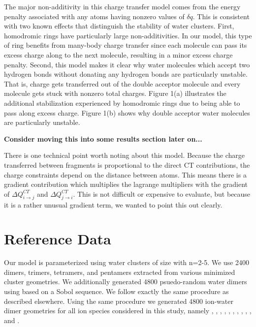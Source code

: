 \documentclass[journal=jacsat,manuscript=article]{achemso}
\begin{document}
The major non-additivity in this charge transfer model comes from
the energy penalty associated with any atoms having nonzero values of $\delta q$.
This is consistent with two known effects that distinguish the stability of water clusters.
First, homodromic rings have particularly large non-additivities.\cite{xantheas2000cooperativity}
In our model, this type of ring benefits from many-body charge transfer since each molecule
can pass its excess charge along to the next molecule, resulting in a minor excess charge penalty.
Second, this model makes it clear why water molecules which accept two hydrogen bonds without
donating any hydrogen bonds are particularly unstable.\cite{kirov2008identifying} That is, charge
gets transferred out of the double acceptor molecule and every molecule gets
stuck with nonzero total charges. Figure 1(a) illustrates the additional stabilization
experienced by homodromic rings due to being able to pass along excess charge. Figure 1(b)
shows why double acceptor water molecules are particularly unstable.

\textbf{Consider moving this into some results section later on...}



There is one technical point worth noting about this model. Because the
charge transferred between fragments is proportional to the direct CT contributions,
the charge constraints depend on the distance between atoms. This means there
is a gradient contribution which multiplies the lagrange multipliers
with the gradient of $\Delta Q^{CT}_{i\rightarrow j}$ and $\Delta Q^{CT}_{j\rightarrow i}$.
This is not difficult or expensive to evaluate, but because it is a rather
unusual gradient term, we wanted to point this out clearly.

\section*{Reference Data}

Our model is parameterized using water clusters of size  with n=2-5.
We use 2400 dimers, trimers, tetramers, and pentamers extracted from various minimized
cluster geometries. We additionally generated 4800 psuedo-random water dimers using
based on a Sobol sequence. We follow exactly the same procedure as described elsewhere.\cite{misquitta2008first}
Using the same procedure we generated 4800 ion-water dimer geometries for all ion species considered in this study,
namely , , , , , , , , , , and .
\end{document}

